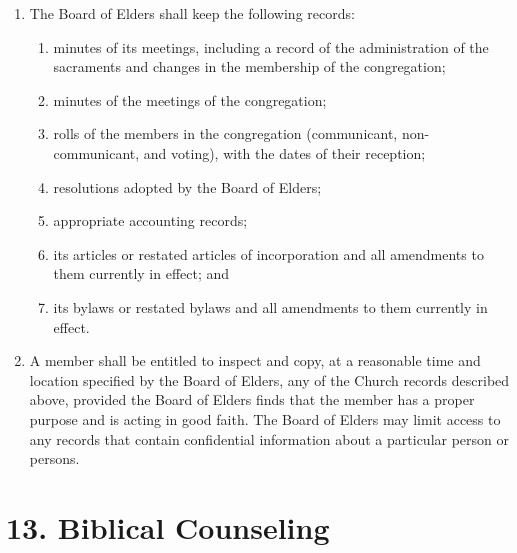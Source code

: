 \documentclass[
]{book}
\providecommand{\tightlist}{%
  \setlength{\itemsep}{0pt}\setlength{\parskip}{0pt}}
\begin{document}
\begin{enumerate}
\def\labelenumi{\alph{enumi}.}
\tightlist
\item
  The Board of Elders shall keep the following records:

  \begin{enumerate}
  \def\labelenumii{(\arabic{enumii})}
  \tightlist
  \item
    minutes of its meetings, including a record of the administration of the sacraments and changes in the membership of the congregation;
  \item
    minutes of the meetings of the congregation;
  \item
    rolls of the members in the congregation (communicant, non-communicant, and voting), with the dates of their reception;
  \item
    resolutions adopted by the Board of Elders;
  \item
    appropriate accounting records;
  \item
    its articles or restated articles of incorporation and all amendments to them currently in effect; and
  \item
    its bylaws or restated bylaws and all amendments to them currently in effect.
  \end{enumerate}
\item
  A member shall be entitled to inspect and copy, at a reasonable time and location specified by the Board of Elders, any of the Church records described above, provided the Board of Elders finds that the member has a proper purpose and is acting in good faith. The Board of Elders may limit access to any records that contain confidential information about a particular person or persons.
\end{enumerate}

\hypertarget{biblical-counseling}{%
\section{13. Biblical Counseling}\label{biblical-counseling}}
\end{document}
